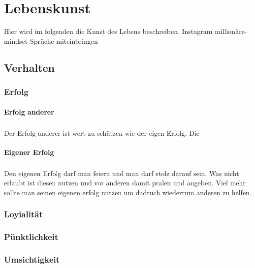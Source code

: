 \chapter{Lebenskunst} 
    \begin{thesis_quotation}
    \end{thesis_quotation}
    
    Hier wird im folgenden die Kunst des Lebens beschreiben. 
    {\color{red}Instagram millionäre-mindset Sprüche miteinbringen }
    
    \section{Verhalten}
        \subsection{Erfolg}
            \subsubsection{Erfolg anderer}
                \paragraph{} Der Erfolg anderer ist wert zu schätzen wie der eigen Erfolg. Die 
            \subsubsection{Eigener Erfolg}
                \paragraph{} Den eigenen Erfolg darf man feiern und man darf stolz darauf sein. Was nicht erlaubt ist diesen nutzen und vor anderen damit pralen und angeben. Viel mehr sollte man seinen eigenen erfolg nutzen um dadruch wiederrum anderen zu helfen.
        \subsection{Loyialität}
        \subsection{Pünktlichkeit}
        \subsection{Umsichtigkeit}

